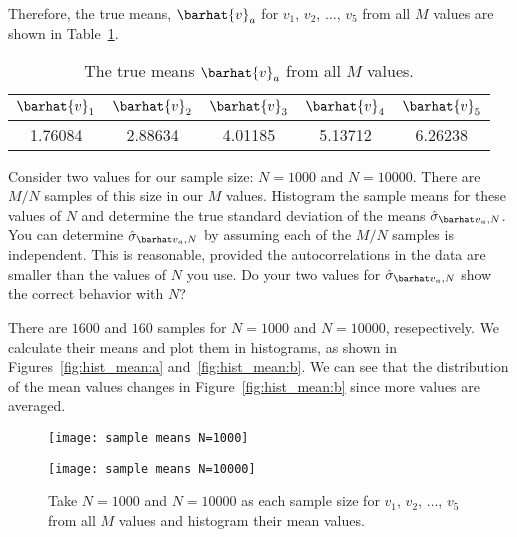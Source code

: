 Therefore, the true means, $\barhat{v}_a$ for $v_1$, $v_2$, $\ldots$, $v_5$ from
all $M$ values are shown in Table~\ref{tab:truemean}.

\begin{table}[H]
    \centering
    \caption{The true means $\barhat{v}_a$ from all $M$ values.}
    \label{tab:truemean}
    \begin{tabular}{@{}ccccc@{}}
        \toprule
        $\barhat{v}_1$ & $\barhat{v}_2$ & $\barhat{v}_3$ & $\barhat{v}_4$ & $\barhat{v}_5$ \\
        \midrule
        1.76084        & 2.88634        & 4.01185        & 5.13712        & 6.26238        \\
        \bottomrule
    \end{tabular}
\end{table}

\Question{} Consider two values for our sample size: $N = 1000$ and $N = 10000$. There are
$M/N$ samples of this size in our $M$ values. Histogram the sample means for these values of
$N$ and determine the true standard deviation of the means $\sgbar{a}$.
You can determine $\sgbar{a}$ by assuming each of the $M/N$ samples is
independent. This is reasonable, provided the autocorrelations in the data are smaller than
the values of $N$ you use. Do your two values for $\sgbar{a}$ show the
correct behavior with $N$?

\Answer{}
There are $1600$ and $160$ samples for $N = 1000$ and $N = 10000$, resepectively.
We calculate their means and plot them in histograms, as shown in
Figures~\ref{fig:hist_mean:a} and~\ref{fig:hist_mean:b}.
We can see that the distribution of the mean values changes in Figure~\ref{fig:hist_mean:b}
since more values are averaged.

\begin{figure}[H]
    \centering
    \begin{minipage}[t]{0.8\linewidth}
        \centering
        \texttt{[image: sample means N=1000]}
        \label{fig:hist_mean:a}
    \end{minipage}
    \hfill
    \begin{minipage}[t]{0.8\linewidth}
        \centering
        \texttt{[image: sample means N=10000]}
        \label{fig:hist_mean:b}
    \end{minipage}
    \caption{Take $N = 1000$ and $N = 10000$ as each sample size
        for $v_1$, $v_2$, $\ldots$, $v_5$ from all $M$ values
        and histogram their mean values.}
    \label{fig:hist_mean}
\end{figure}

